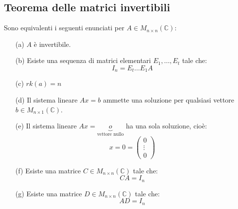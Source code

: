 \documentclass[a4paper]{article}
\theoremstyle{break}
\theoremstyle{break}
\theoremstyle{break}
\theoremstyle{break}
\begin{document}
\subsection{Teorema delle matrici invertibili}
Sono equivalenti i seguenti enunciati per \( A \in M_{n \times n}(\mathbb{C}) \):
\begin{enumerate}
  \item[(a)] \( A \) è invertibile.
  \item[(b)] Esiste una sequenza di matrici elementari \( E_1, \ldots, E_t \) tale che:
    \[
      I_n = E_t \ldots E_1 A
    \]
  \item[(c)] \( rk(a) = n \)
  \item[(d)] Il sistema lineare \( Ax = b \) ammette una soluzione per qualsiasi vettore \( b \in 
    M_{n \times 1}(\mathbb{C}) \).
  \item[(e)] Il sistema lineare \( Ax = \underbrace{o}_{\text{vettore nullo}} \) ha una
    sola soluzione, cioè: \[ x = 0 = \begin{pmatrix} 0 \\ \vdots \\ 0 \end{pmatrix}  \]
  \item[(f)] Esiste una matrice \( C \in M_{n \times n}(\mathbb{C}) \) tale che:
    \[
      CA = I_n
    \]
  \item[(g)] Esiste una matrice \( D \in M_{n \times n}(\mathbb{C}) \) tale che:
    \[
      AD = I_n
    \]
\end{enumerate}
\end{document}
